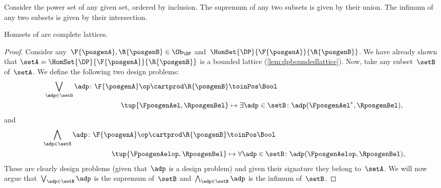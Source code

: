 \begin{example}
    Consider the power set of any given set, ordered by inclusion.
    The supremum of any two subsets is given by their union.
    The infimum of any two subsets is given by their intersection.
\end{example}

\begin{lemma}
    \label{lem:DP-homsets-complete-lattice}
    Homsets of \DP are complete lattices.
\end{lemma}

\begin{proof}
    Consider any~$\F{\posgenA},\R{\posgenB}\in \Ob_\DP$ and~$\HomSet{\DP}{\F{\posgenA}}{\R{\posgenB}}$.
    We have already shown that $\setA=\HomSet{\DP}{\F{\posgenA}}{\R{\posgenB}}$ is a bounded lattice (\cref{lem:dpboundedlattice}).
    Now, take any subset~$\setB$ of~$\setA$.
    We define the following two design problems:
    \begin{equation*}
        \begin{aligned}
            \bigvee_{\adp \in \setB} \adp\colon \F{\posgenA}\op \cartprod \R{\posgenB} & \toinPos \Bool                                                       \\
            \tup{\FposgenAel,\RposgenBel}                                              & \mapsto \exists \adp\in \setB\colon \adp(\FposgenAel^*,\RposgenBel),
        \end{aligned}
    \end{equation*}
    and
    \begin{equation*}
        \begin{aligned}
            \bigwedge_{\adp \in \setB} \adp\colon \F{\posgenA}\op \cartprod \R{\posgenB} & \toinPos \Bool                                                       \\
            \tup{\FposgenAelop,\RposgenBel}                                              & \mapsto \forall \adp\in \setB\colon \adp(\FposgenAelop,\RposgenBel),
        \end{aligned}
    \end{equation*}
    These are clearly design problems (given that~$\adp$ is a design problem) and given their signature they belong to~$\setA$.
    We will now argue that~$\bigvee_{\adp \in \setB} \adp$ is the supremum of~$\setB$ and~$\bigwedge_{\adp \in \setB} \adp$ is the infimum of~$\setB$.

\end{proof}
